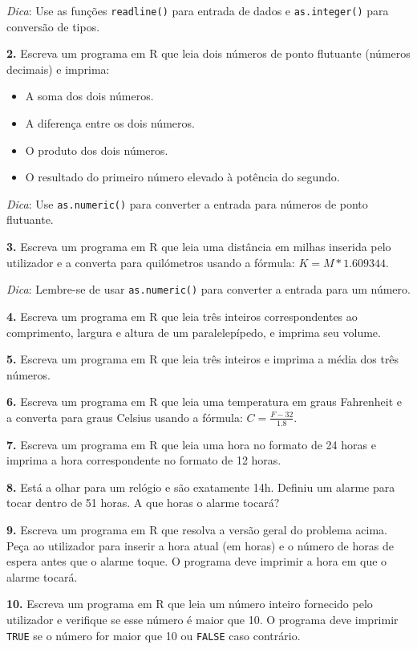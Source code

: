 \documentclass[
]{book}
\providecommand{\tightlist}{%
  \setlength{\itemsep}{0pt}\setlength{\parskip}{0pt}}
\begin{document}
\emph{Dica}: Use as funções \texttt{readline()} para entrada de dados e
\texttt{as.integer()} para conversão de tipos.

\textbf{2.} Escreva um programa em R que leia dois números de ponto flutuante
(números decimais) e imprima:

\begin{itemize}
\tightlist
\item
  A soma dos dois números.
\item
  A diferença entre os dois números.
\item
  O produto dos dois números.
\item
  O resultado do primeiro número elevado à potência do segundo.
\end{itemize}

\emph{Dica}: Use \texttt{as.numeric()} para converter a entrada para números de
ponto flutuante.

\textbf{3.} Escreva um programa em R que leia uma distância em milhas
inserida pelo utilizador e a converta para quilómetros usando a fórmula:
\(K = M*1.609344\).

\emph{Dica}: Lembre-se de usar \texttt{as.numeric()} para converter a entrada para
um número.

\textbf{4.} Escreva um programa em R que leia três inteiros correspondentes
ao comprimento, largura e altura de um paralelepípedo, e imprima seu
volume.

\textbf{5.} Escreva um programa em R que leia três inteiros e imprima a média
dos três números.

\textbf{6.} Escreva um programa em R que leia uma temperatura em graus
Fahrenheit e a converta para graus Celsius usando a fórmula:
\(C = \frac{F - 32}{1.8}\).

\textbf{7.} Escreva um programa em R que leia uma hora no formato de 24 horas
e imprima a hora correspondente no formato de 12 horas.

\textbf{8.} Está a olhar para um relógio e são exatamente 14h. Definiu um
alarme para tocar dentro de 51 horas. A que horas o alarme tocará?

\textbf{9.} Escreva um programa em R que resolva a versão geral do problema
acima. Peça ao utilizador para inserir a hora atual (em horas) e o
número de horas de espera antes que o alarme toque. O programa deve
imprimir a hora em que o alarme tocará.

\textbf{10.} Escreva um programa em R que leia um número inteiro fornecido
pelo utilizador e verifique se esse número é maior que 10. O programa
deve imprimir \texttt{TRUE} se o número for maior que 10 ou \texttt{FALSE} caso
contrário.
\end{document}
